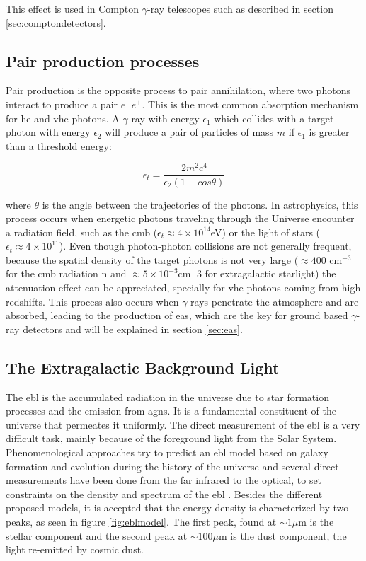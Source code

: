 \documentclass[main.tex]{subfiles}
\begin{document}
This effect is used in Compton $\gamma$-ray telescopes such as described in section \ref{sec:comptondetectors}. 

\subsection{Pair production processes}

Pair production is the opposite process to pair annihilation, where two photons interact to produce a pair $e^{-}e^{+}$. This is the most common absorption mechanism for \gls{he} and \gls{vhe} photons.
A $\gamma$-ray with energy $\epsilon_1$ which collides with a target photon with energy $\epsilon_2$ will produce a pair of particles of mass $m$ if $\epsilon_1$ is greater than a threshold energy:

\begin{equation}
    \epsilon_t = \frac{2m^2c^4}{\epsilon_2(1-cos\theta)}
\end{equation}

where $\theta$ is the angle between the trajectories of the photons. In astrophysics, this process occurs when energetic photons traveling through the Universe encounter a radiation field, such as the \gls{cmb} ($\epsilon_t \approx 4\times10^{14}$eV) or the light of stars ($\epsilon_t \approx 4\times10^{11}$). Even though photon-photon collisions are not generally frequent, because the spatial density of the target photons is not very large ($\approx 400$ cm$^{-3}$ for the \gls{cmb} radiation n and $\approx 5\times10^{-3}$cm$^-3$ for extragalactic starlight) the attenuation effect can be appreciated, specially for \gls{vhe} photons coming from high redshifts. 
This process also occurs when $\gamma$-rays penetrate the atmosphere and are absorbed, leading to the production of \gls{eas}, which are the key for ground based $\gamma$-ray detectors and will be explained in section \ref{sec:eas}.


\subsection{The Extragalactic Background Light}

The \gls{ebl} is the accumulated radiation in the universe due to star formation processes and the emission from \glspl{agn}. It is a fundamental constituent of the universe that permeates it uniformly. The direct measurement of the \gls{ebl} is a very difficult task, mainly because of the foreground light from the Solar System.  Phenomenological approaches try to predict an \gls{ebl} model based on galaxy formation and evolution during the history of the universe and several direct measurements have been done from the far infrared to the optical, to set constraints on the density and spectrum of the \gls{ebl} \cite{DominguezEBL}. Besides the different proposed models, it is accepted that the energy density is characterized by two peaks, as seen in figure \ref{fig:eblmodel}. The first peak, found at $\sim 1\mu$m is the stellar component and the second peak at $\sim 100 \mu $m is the dust component, the light re-emitted by cosmic dust. 
\end{document}
